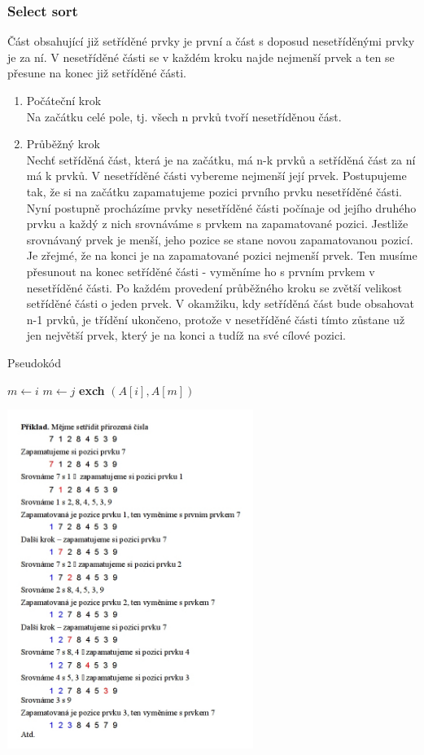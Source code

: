 \documentclass[10pt,a4paper]{article}
\begin{document}
\subsubsection{Select sort}
Část obsahující již setříděné prvky je první a část s doposud nesetříděnými prvky je za ní. V nesetříděné části se v každém kroku najde nejmenší prvek a ten se přesune na konec již setříděné části.
\begin{enumerate}
	\item Počáteční krok \\
	Na začátku celé pole, tj. všech n prvků tvoří nesetříděnou část.
	\item Průběžný krok \\
	Nechť setříděná část, která je na začátku, má n-k prvků a setříděná část za ní má k prvků. V nesetříděné části vybereme nejmenší její prvek. Postupujeme tak, že si na začátku zapamatujeme pozici prvního prvku nesetříděné části. Nyní postupně procházíme prvky nesetříděné části počínaje od jejího druhého prvku a každý z nich srovnáváme s prvkem na zapamatované pozici. Jestliže srovnávaný prvek je menší, jeho pozice se stane novou zapamatovanou pozicí. Je zřejmé, že na konci je na zapamatované pozici nejmenší prvek. Ten musíme přesunout na konec setříděné části - vyměníme ho s prvním prvkem v nesetříděné části. Po každém provedení průběžného kroku se zvětší velikost setříděné části o jeden prvek. V okamžiku, kdy setříděná část bude obsahovat n-1 prvků, je třídění ukončeno, protože v nesetříděné části tímto zůstane už jen největší prvek, který je na konci a tudíž na své cílové pozici.
\end{enumerate}
\begin{algorithm}
\caption{Pseudokód}
\begin{algorithmic}[]
	\State $m \gets i$
			\State $m \gets j$
		\EndIf
	\EndFor
	\textbf{exch} $(A[i], A[m])$
\EndFor
\EndProcedure
\end{algorithmic}
\end{algorithm}
\includegraphics[width=8cm]{img/select}
\end{document}
